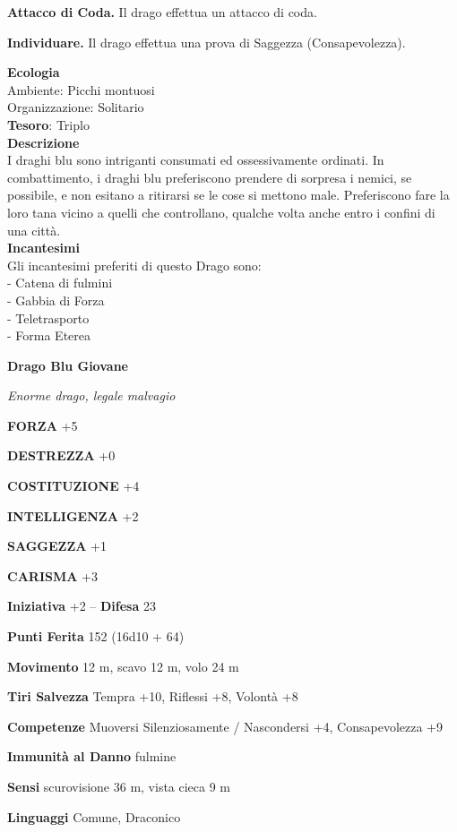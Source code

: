 \begin{multicols}{2}
\textbf{Attacco di Coda.} Il drago effettua un attacco di coda.

\textbf{Individuare.} Il drago effettua una prova di Saggezza (Consapevolezza).

\textbf{Ecologia}\\
Ambiente: Picchi montuosi\\
Organizzazione: Solitario\\
\textbf{Tesoro}: Triplo\\
\textbf{Descrizione}\\
I draghi blu sono intriganti consumati ed ossessivamente ordinati. In combattimento, i draghi blu preferiscono prendere di sorpresa i nemici, se possibile, e non esitano a ritirarsi se le cose si mettono male. Preferiscono fare la loro tana vicino a quelli che controllano, qualche volta anche entro i confini di una città.\\
\textbf{Incantesimi}\\
Gli incantesimi preferiti di questo Drago sono:\\
- Catena di fulmini\\
- Gabbia di Forza\\
- Teletrasporto\\
- Forma Eterea


\medskip{}\textbf{Drago Blu Giovane}

\textit{Enorme drago, legale malvagio}

\textbf{FORZA} +5

\textbf{DESTREZZA} +0

\textbf{COSTITUZIONE} +4

\textbf{INTELLIGENZA} +2

\textbf{SAGGEZZA} +1

\textbf{CARISMA} +3

\textbf{Iniziativa} +2 -- \textbf{Difesa} 23

\textbf{Punti Ferita} 152 (16d10 + 64)

\textbf{Movimento} 12 m, scavo 12 m, volo 24 m

\textbf{Tiri Salvezza} Tempra +10, Riflessi +8, Volontà +8

\textbf{Competenze} Muoversi Silenziosamente / Nascondersi +4, Consapevolezza +9

\textbf{Immunità al Danno} fulmine

\textbf{Sensi} scurovisione 36 m, vista cieca 9 m

\textbf{Linguaggi} Comune, Draconico


\end{multicols}
